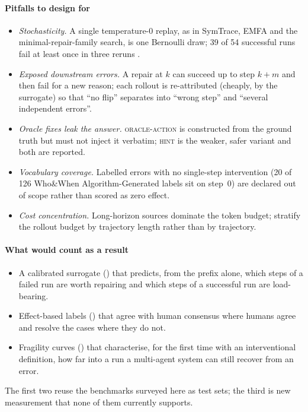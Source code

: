 \documentclass[10pt,a4paper]{article}
\begin{document}
\paragraph{Pitfalls to design for}
\begin{itemize}[leftmargin=1.1em]
\item \emph{Stochasticity.} A single temperature-0 replay, as in SymTrace, EMFA and the minimal-repair-family search, is one Bernoulli draw; 39 of 54 successful runs fail at least once in three reruns \cite{luan2026symtrace}.
\item \emph{Exposed downstream errors.} A repair at $k$ can succeed up to step $k+m$ and then fail for a new reason; each rollout is re-attributed (cheaply, by the surrogate) so that ``no flip'' separates into ``wrong step'' and ``several independent errors''.
\item \emph{Oracle fixes leak the answer.} \textsc{oracle-action} is constructed from the ground truth but must not inject it verbatim; \textsc{hint} is the weaker, safer variant and both are reported.
\item \emph{Vocabulary coverage.} Labelled errors with no single-step intervention (20 of 126 Who\&When Algorithm-Generated labels sit on step~0) are declared out of scope rather than scored as zero effect.
\item \emph{Cost concentration.} Long-horizon sources dominate the token budget; stratify the rollout budget by trajectory length rather than by trajectory.
\end{itemize}

\paragraph{What would count as a result}
\begin{itemize}[leftmargin=1.1em]
\item A calibrated surrogate () that predicts, from the prefix alone, which steps of a failed run are worth repairing and which steps of a successful run are load-bearing.
\item Effect-based labels () that agree with human consensus where humans agree and resolve the cases where they do not.
\item Fragility curves () that characterise, for the first time with an interventional definition, how far into a run a multi-agent system can still recover from an error.
\end{itemize}
The first two reuse the benchmarks surveyed here as test sets; the third is new measurement that none of them currently supports.

\clearpage

\end{document}

